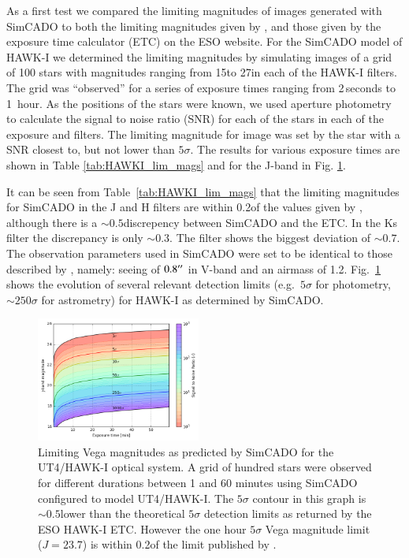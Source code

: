 As a first test we compared the limiting magnitudes of images generated with SimCADO to both the limiting magnitudes given by \citet{hawki}, and those given by the exposure time calculator (ETC) on the ESO website. For the SimCADO model of HAWK-I we determined the limiting magnitudes by simulating images of a grid of 100 stars with magnitudes ranging from 15\m to 27\m in each of the HAWK-I filters. The grid was ``observed'' for a series of exposure times ranging from 2\,seconds to 1~hour. As the positions of the stars were known, we used aperture photometry to calculate the signal to noise ratio (SNR) for each of the stars in each of the exposure and filters. The limiting magnitude for image was set by the star with a SNR closest to, but not lower than $5\sigma$. The results for various exposure times are shown in Table \ref{tab:HAWKI_lim_mags} and for the J-band in Fig. \ref{fig:HAWKI_rainbow_j}.

It can be seen from Table~\ref{tab:HAWKI_lim_mags} that the limiting magnitudes for SimCADO in the J and H filters are within 0.2\m of the values given by \citet{hawki}, although there is a $\sim 0.5$\m discrepency between SimCADO and the ETC. In the Ks filter the discrepancy is only $\sim 0.3$\m. The \brgamma filter shows the biggest deviation of $\sim 0.7$\m. The observation parameters used in SimCADO were set to be identical to those described by \citet{hawki}, namely: seeing of $0.8^{\prime\prime}$ in V-band and an airmass of 1.2. Fig.~\ref{fig:HAWKI_rainbow_j} shows the evolution of several relevant detection limits (e.g.\ $5\sigma$ for photometry, $\sim 250\sigma$ for astrometry) for HAWK-I as determined by SimCADO.


\begin{figure}

    \centering
    \includegraphics[width=0.48\textwidth]{images/HAWKI_SNR_Rainbow_J}
    
    \caption{Limiting Vega magnitudes as predicted by SimCADO for the UT4/HAWK-I optical system. A grid of hundred stars were observed for different durations between 1 and 60 minutes using SimCADO configured to model UT4/HAWK-I. The $5\sigma$ contour in this graph is $\sim 0.5$\m lower than the theoretical $5\sigma$ detection limits as returned by the ESO HAWK-I ETC. However the one hour $5\sigma$ Vega magnitude limit ($J=23.7$\m) is within 0.2\m  of the limit published by \citet{hawki}.}
    \label{fig:HAWKI_rainbow_j}

\end{figure}


